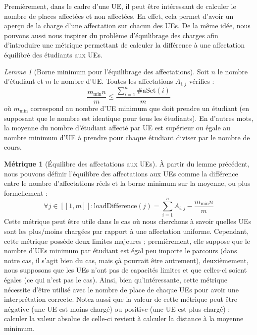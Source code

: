 \documentclass{rapport}
\theoremstyle{definition}
\theoremstyle{remark}
\newtheorem{lemme}{Lemme}
\theoremstyle{definition}
\newtheorem*{metric}{Métrique}
\theoremstyle{remark}
\newcommand{\llbracket}{[\![}
\newcommand{\rrbracket}{]\!]}
\begin{document}
Premièrement, dans le cadre d'une UE, il peut être intéressant de calculer le nombre de places affectées et non affectées. En effet, cela permet d'avoir un aperçu de la charge d'une affectation sur chacun des UEs.
De la même idée, nous pouvons aussi nous inspirer du problème d'équilibrage des charges afin d'introduire une métrique permettant de calculer la différence à une affectation équilibré des étudiants aux UEs.

\begin{lemme}[Borne minimum pour l'équilibrage des affectations]
    Soit $n$ le nombre d'étudiant et $m$ le nombre d'UE. Toutes les affectations $A_{i,j}$ vérifies :
    $$
        \frac{m_{\min}n}{m} \le \frac{\sum_{i=1}^{n}\#\text{aSet}(i)}{m}
    $$
    où $m_{\min}$ correspond au nombre d'UE minimum que doit prendre un étudiant (en supposant que le nombre est identique pour tous les étudiants).
    En d'autres mots, la moyenne du nombre d'étudiant affecté par UE est supérieur ou égale au nombre minimum d'UE à prendre pour chaque étudiant diviser par le nombre de cours.
\end{lemme}
\begin{metric}[Équilibre des affectations aux UEs]
    À partir du lemme précédent, nous pouvons définir l'équilibre des affectations aux UEs comme la différence entre le nombre d'affectations réels et la borne minimum sur la moyenne, ou plus formellement :
    $$
        \forall j \in \llbracket 1,m\rrbracket : \text{loadDifference}(j) = \sum_{i=1}^{n}A_{i,j} - \frac{m_{\min}n}{m}
    $$
    Cette métrique peut être utile dans le cas où nous cherchons à savoir quelles UEs sont les plus/moins chargées par rapport à une affectation uniforme.
    Cependant, cette métrique possède deux limites majeures ; premièrement, elle suppose que le nombre d'UEs minimum par étudiant est égal peu importe le parcours (dans notre cas, il s'agit bien du cas, mais çà pourrait être autrement), deuxièmement, nous supposons que les UEs n'ont pas de capacités limites et que celles-ci soient égales (ce qui n'est pas le cas).
    Ainsi, bien qu'intéressante, cette métrique nécessite d'être utilisé avec le nombre de place de chaque UEs pour avoir une interprétation correcte.
    Notez aussi que la valeur de cette métrique peut être négative (une UE est moins chargé) ou positive (une UE est plus chargé) ; calculer la valeur absolue de celle-ci revient à calculer la distance à la moyenne minimum.
\end{metric}
\end{document}
